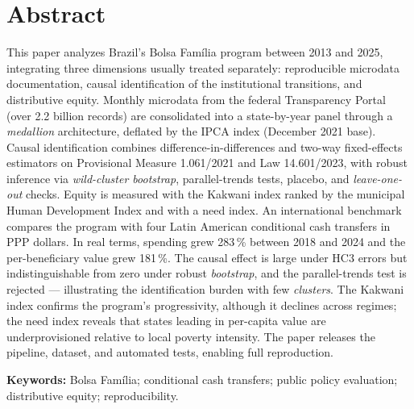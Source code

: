 \documentclass[12pt,a4paper,oneside]{article}
\begin{document}
\vspace{6pt}
\section*{Abstract}
\begin{singlespace}\small\noindent
This paper analyzes Brazil's Bolsa Família program between 2013 and 2025, integrating three dimensions usually treated separately: reproducible microdata documentation, causal identification of the institutional transitions, and distributive equity. Monthly microdata from the federal Transparency Portal (over 2.2 billion records) are consolidated into a state-by-year panel through a \textit{medallion} architecture, deflated by the IPCA index (December 2021 base). Causal identification combines difference-in-differences and two-way fixed-effects estimators on Provisional Measure 1.061/2021 and Law 14.601/2023, with robust inference via \textit{wild-cluster bootstrap}, parallel-trends tests, placebo, and \textit{leave-one-out} checks. Equity is measured with the Kakwani index ranked by the municipal Human Development Index and with a need index. An international benchmark compares the program with four Latin American conditional cash transfers in PPP dollars. In real terms, spending grew 283\,\% between 2018 and 2024 and the per-beneficiary value grew 181\,\%. The causal effect is large under HC3 errors but indistinguishable from zero under robust \textit{bootstrap}, and the parallel-trends test is rejected --- illustrating the identification burden with few \textit{clusters}. The Kakwani index confirms the program's progressivity, although it declines across regimes; the need index reveals that states leading in per-capita value are underprovisioned relative to local poverty intensity. The paper releases the pipeline, dataset, and automated tests, enabling full reproduction.

\vspace{6pt}\noindent\textbf{Keywords:} Bolsa Família; conditional cash transfers; public policy evaluation; distributive equity; reproducibility.
\end{singlespace}

\vspace{6pt}
\end{document}
